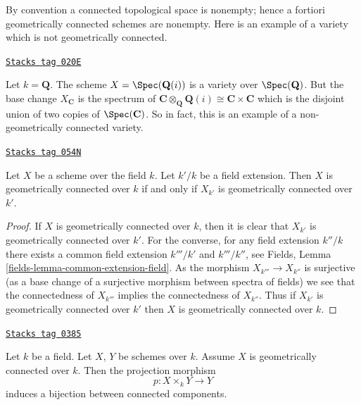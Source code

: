 By convention a connected topological space is nonempty; hence a fortiori
geometrically connected schemes are nonempty.
Here is an example of a variety which is not geometrically connected.

\begin{example}
\label{varieties-example-not-geometrically-irreducible}
\href{https://stacks.math.columbia.edu/tag/020E}{\texttt{Stacks tag 020E}}

Let $k = \mathbf{Q}$. The scheme
$X = \Spec(\mathbf{Q}(i))$ is a variety over $\Spec(\mathbf{Q})$.
But the base change $X_{\mathbf{C}}$ is the spectrum of
$\mathbf{C} \otimes_{\mathbf{Q}} \mathbf{Q}(i) \cong
\mathbf{C} \times \mathbf{C}$ which is the disjoint union of
two copies of $\Spec(\mathbf{C})$. So in fact, this is an
example of a non-geometrically connected variety.
\end{example}

\begin{lemma}
\label{varieties-lemma-geometrically-connected-check-after-extension}
\href{https://stacks.math.columbia.edu/tag/054N}{\texttt{Stacks tag 054N}}

Let $X$ be a scheme over the field $k$.
Let $k'/k$ be a field extension.
Then $X$ is geometrically connected over $k$ if and only if
$X_{k'}$ is geometrically connected over $k'$.
\end{lemma}

\begin{proof}
If $X$ is geometrically connected over $k$, then it is clear that
$X_{k'}$ is geometrically connected over $k'$. For the converse,
for any field extension $k''/k$ there exists a common
field extension $k'''/k'$ and $k'''/k''$, see
Fields, Lemma \ref{fields-lemma-common-extension-field}. As the
morphism $X_{k'''} \to X_{k''}$ is surjective (as a base change of
a surjective morphism between spectra of fields) we see that the
connectedness of $X_{k'''}$ implies the connectedness of $X_{k''}$.
Thus if $X_{k'}$ is geometrically connected over $k'$ then
$X$ is geometrically connected over $k$.
\end{proof}

\begin{lemma}
\label{varieties-lemma-bijection-connected-components}
\href{https://stacks.math.columbia.edu/tag/0385}{\texttt{Stacks tag 0385}}

Let $k$ be a field.
Let $X$, $Y$ be schemes over $k$.
Assume $X$ is geometrically connected over $k$.
Then the projection morphism
$$
p : X \times_k Y \longrightarrow Y
$$
induces a bijection between connected components.
\end{lemma}


